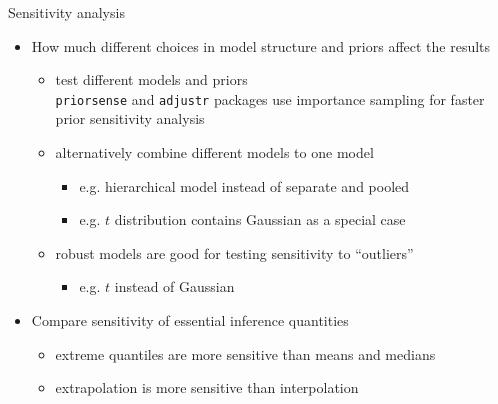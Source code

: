 \documentclass[t]{beamer}
\begin{document}
\begin{frame}{Sensitivity analysis}

  \begin{itemize}
  \item How much different choices in model structure and priors affect the results
    \begin{itemize}
    \item<2-> test different models and priors\\
      \texttt{priorsense} and \texttt{adjustr} packages use importance
      sampling for faster prior sensitivity analysis
      \item<3-> alternatively combine different models to one model
        \begin{itemize}
        \item e.g. hierarchical model instead of separate and pooled
        \item e.g. $t$ distribution contains Gaussian as a special case
      \end{itemize}
      \item<3-> robust models are good for testing sensitivity to ``outliers''
        \begin{itemize}
        \item e.g. $t$ instead of Gaussian
        \end{itemize}
    \end{itemize}
    \item<4-> Compare sensitivity of essential inference quantities
      \begin{itemize}
      \item extreme quantiles are more sensitive than means and medians
      \item extrapolation is more sensitive than interpolation
      \end{itemize}
    \end{itemize}

\end{frame}
\end{document}
